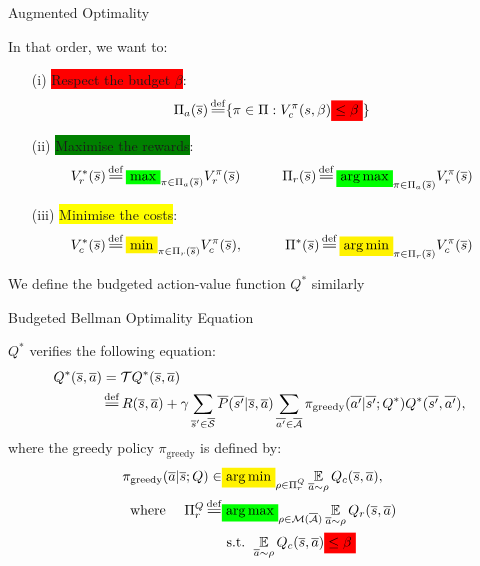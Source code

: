 \documentclass{beamer}
\newcommand{\mathcolorbox}[2]{\colorbox{#1}{$\displaystyle #2$}}
\begin{document}
    \begin{frame}{Augmented Optimality}
        \begin{definition}
            In that order, we want to:
            \begin{enumerate}
                \item[(i)] \pause\colorbox{red}{Respect the budget $\beta$}:
                \begin{equation*}
                    \Pi_a(\os) \eqdef \{\pi\in\Pi: V_c^\pi(s, \beta) \mathcolorbox{red}{\leq \beta}\}
                \end{equation*}
                \item[(ii)] \pause\colorbox{green}{Maximise the rewards}:
                \begin{equation*}
                    V_r^*(\os) \eqdef \mathcolorbox{green}{\max}_{\pi\in\Pi_a(\os)}  V_r^\pi(\os) \qquad\quad \Pi_r(\os) \eqdef \mathcolorbox{green}{\argmax}_{\pi\in\Pi_a(\os)}  V_r^\pi(\os)
                \end{equation*}
                \item[(iii)] \pause\colorbox{yellow}{Minimise the costs}:
                \begin{equation*}
                    V_c^*(\os) \eqdef \mathcolorbox{yellow}{\min}_{\pi\in\Pi_r(\os)}  V_c^\pi(\os), \qquad\quad \Pi^*(\os) \eqdef \mathcolorbox{yellow}{\argmin}_{\pi\in\Pi_r(\os)}  V_c^\pi(\os)
                \end{equation*}
            \end{enumerate}

            \pause We define the budgeted action-value function $Q^*$ similarly
        \end{definition}
    \end{frame}

    \begin{frame}{Budgeted Bellman Optimality Equation}
        \begin{theorem}
            $Q^*$ verifies the following equation:
            \begin{align*}
                Q^{*}(\os, \oa) &= \cT Q^{*}(\os, \oa)\\
                &\eqdef R(\os, \oa) + \gamma \sum_{\os'\in\ocS} \ov{P}(\ov{s'} | \os, \oa)\sum_{\ov{a'}\in \ocA} \pi_\text{greedy}(\ov{a'}|\ov{s'}; Q^*) Q^{*}(\ov{s'}, \ov{a'}),
            \end{align*}
            where the greedy policy $\pi_\text{greedy}$ is defined by:
            \begin{align*}
                \pi_\text{greedy}(\oa|\os; Q) \in &\mathcolorbox{yellow}{\argmin}_{\rho\in\Pi_r^Q} \expectedvalueover{\oa\sim\rho}Q_c(\os, \oa), \\
                \text{where }\quad \Pi_r^Q \eqdef &\mathcolorbox{green}{\argmax}_{\rho\in\cM(\ocA)} \expectedvalueover{\oa\sim\rho} Q_r(\os, \oa) \\
                & \text{ s.t. }  \expectedvalueover{\oa\sim\rho} Q_c(\os, \oa) \mathcolorbox{red}{\leq \beta}
            \end{align*}
        \end{theorem}
    \end{frame}
\end{document}
